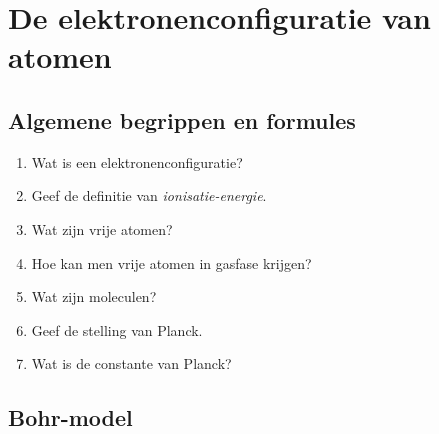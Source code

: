 \documentclass[a4paper,12pt]{article}
\begin{document}
    \section{De elektronenconfiguratie van atomen}

    \subsection{Algemene begrippen en formules}

    \begin{enumerate}
        \item Wat is een elektronenconfiguratie?
        \item Geef de definitie van \emph{ionisatie-energie}.
        \item Wat zijn vrije atomen?
        \item Hoe kan men vrije atomen in gasfase krijgen?
        \item Wat zijn moleculen?
        \item Geef de stelling van Planck.
        \item Wat is de constante van Planck?
    \end{enumerate}

    \subsection{Bohr-model}
\end{document}
